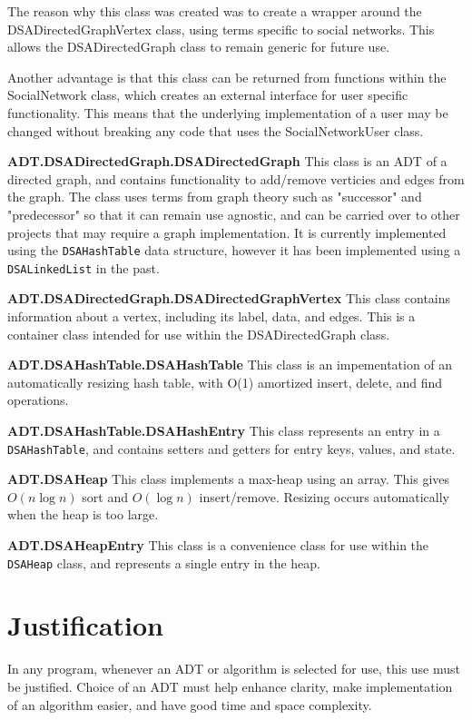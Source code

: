 \documentclass{article}
\begin{document}
The reason why this class was created was to create a wrapper around the
DSADirectedGraphVertex class, using terms specific to social networks.
This allows the DSADirectedGraph class to remain generic for future use.

Another advantage is that this class can be returned from functions within
the SocialNetwork class, which creates an external interface for user specific
functionality. This means that the underlying implementation of a user may be
changed without breaking any code that uses the SocialNetworkUser class.

\textbf{ADT.DSADirectedGraph.DSADirectedGraph}
This class is an ADT of a directed graph, and contains functionality to add/remove verticies and edges from the graph.
The class uses terms from graph theory such as "successor" and "predecessor"
so that it can remain use agnostic, and can be carried over to other projects
that may require a graph implementation.
It is currently implemented using the \texttt{DSAHashTable} data structure,
however it has been implemented using a \texttt{DSALinkedList} in the past.

\textbf{ADT.DSADirectedGraph.DSADirectedGraphVertex}
This class contains information about a vertex, including its label, data, and edges.
This is a container class intended for use within the DSADirectedGraph class.

\textbf{ADT.DSAHashTable.DSAHashTable}
This class is an impementation of an automatically resizing hash table,
with O(1) amortized insert, delete, and find operations.

\textbf{ADT.DSAHashTable.DSAHashEntry}
This class represents an entry in a \texttt{DSAHashTable},
and contains setters and getters for entry keys, values, and state.

\textbf{ADT.DSAHeap}
This class implements a max-heap using an array.
This gives $O\left(n\log n\right)$ sort and $O\left(\log n\right)$ insert/remove.
Resizing occurs automatically when the heap is too large.

\textbf{ADT.DSAHeapEntry}
This class is a convenience class for use within the \texttt{DSAHeap} class,
and represents a single entry in the heap.

\section{Justification}
In any program, whenever an ADT or algorithm is selected for use, this use must be justified.
Choice of an ADT must help enhance clarity, make implementation of an algorithm easier,
and have good time and space complexity.\\
\end{document}
